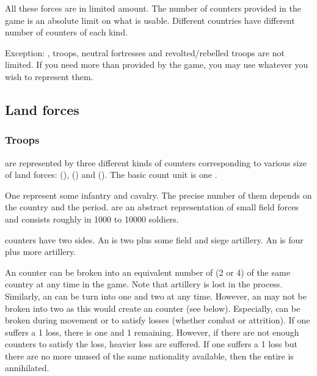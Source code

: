 All these forces are in limited amount. The number of counters provided in the
game is an absolute limit on what is usable. Different countries have
different number of counters of each kind.

Exception:  \corsaire,  troops, neutral fortresses
and revolted/rebelled troops are not limited. If you need more than provided
by the game, you may use whatever you wish to represent them.



\subsection{Land forces}


\subsubsection{Troops}\label{chLogistic:Troops definition}
\aparag[Troops] are represented by three different kinds of counters
corresponding to various size of land forces:  (\ARMY),
 (\LD) and 
(\LDE).
\bparag The basic count unit is one \LD.

\aparag[Detachments.] One \LD represent some infantry and cavalry. The precise
number of them depends on the country and the period. \LD are an abstract
representation of small field forces and consists roughly in 1000 to 10000
soldiers.

\aparag[Armies.] \ARMY counters have two sides. An \ARMY\facemoins is two \LD
plus some field and siege artillery. An \ARMY\faceplus is four \LD plus more
artillery.

 An \ARMY counter can be broken into an equivalent
number of \LD (2 or 4) of the same country at any time in the game. Note that
artillery is lost in the process.
\bparag Similarly, an \ARMY\faceplus can be turn into one \ARMY\facemoins and
two \LD at any time.
\bparag However, an \ARMY\faceplus may not be broken into two
\ARMY\facemoins as this would create an \ARMY counter (see below).
\bparag Especially, \ARMY can be broken during movement or to satisfy losses
(whether combat or attrition). If one \ARMY\faceplus suffers a 1 \LD loss,
there is one \ARMY\facemoins and 1 \LD remaining.
\bparag However, if there are not enough \LD counters to satisfy the loss,
heavier loss are suffered. If one \ARMY\facemoins suffers a 1 \LD loss but
there are no more unused \LD of the same nationality available, then the
entire \ARMY\facemoins is annihilated.

